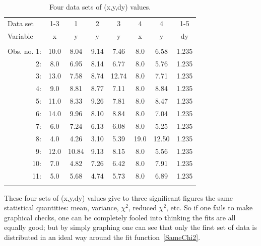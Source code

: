 \documentclass[10pt,superscriptaddress,aps,prc,twocolumn]{revtex4-1}
\begin{document}
\begin{appendix}
\begin{table}[htb]
\caption{Four data sets of (x,y,dy) values.}
\begin{tabular}{rccccccc}
\multicolumn{1}{l}{Data set}    & 1-3  & 1    & 2    & 3    & 4   & 4    & 1-5   \\
\multicolumn{1}{l}{Variable}    & x    & y    & y    & y    & x   & y    & dy    \\  
                                &      &      &      &      &     &      &       \\
Obs. no. 1: & 10.0 & 8.04 & 9.14 & 7.46 & 8.0 & 6.58 & 1.235 \\ 
         2: &  8.0 & 6.95 & 8.14 & 6.77 & 8.0 & 5.76 & 1.235 \\
         3: & 13.0 & 7.58 & 8.74 &12.74 & 8.0 & 7.71 & 1.235 \\
         4: &  9.0 & 8.81 & 8.77 & 7.11 & 8.0 & 8.84 & 1.235 \\
         5: & 11.0 & 8.33 & 9.26 & 7.81 & 8.0 & 8.47 & 1.235 \\
         6: & 14.0 & 9.96 & 8.10 & 8.84 & 8.0 & 7.04 & 1.235 \\
         7: &  6.0 & 7.24 & 6.13 & 6.08 & 8.0 & 5.25 & 1.235 \\
         8: &  4.0 & 4.26 & 3.10 & 5.39 &19.0 &12.50 & 1.235 \\
         9: & 12.0 &10.84 & 9.13 & 8.15 & 8.0 & 5.56 & 1.235 \\
        10: &  7.0 & 4.82 & 7.26 & 6.42 & 8.0 & 7.91 & 1.235 \\
        11: &  5.0 & 5.68 & 4.74 & 5.73 & 8.0 & 6.89 & 1.235 \\ 
            &      &      &      &      &     &      &       \\ \hline
\end{tabular}
\label{quartet}
\end{table}

These four sets of (x,y,dy) values give to three significant figures the
same statistical quantities: mean, variance, $\chi^2$, reduced $\chi^2$, etc.
So if one fails to make graphical checks, one can be completely fooled into thinking
the fits are all equally good; but by simply graphing one can see that only the first set 
of data is distributed in an ideal way around the fit function~\ref{SameChi2}.   


\end{appendix}
\end{document}
